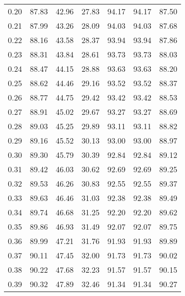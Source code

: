 \begin{tabular}{|c|c|c|c|c|c|c|}
      0.20 &     87.83 &     42.96 &      27.83 &   94.17 &      94.17 &         87.50 \\
      0.21 &     87.99 &     43.26 &      28.09 &   94.03 &      94.03 &         87.68 \\
      0.22 &     88.16 &     43.58 &      28.37 &   93.94 &      93.94 &         87.86 \\
      0.23 &     88.31 &     43.84 &      28.61 &   93.73 &      93.73 &         88.03 \\
      0.24 &     88.47 &     44.15 &      28.88 &   93.63 &      93.63 &         88.20 \\
      0.25 &     88.62 &     44.46 &      29.16 &   93.52 &      93.52 &         88.37 \\
      0.26 &     88.77 &     44.75 &      29.42 &   93.42 &      93.42 &         88.53 \\
      0.27 &     88.91 &     45.02 &      29.67 &   93.27 &      93.27 &         88.69 \\
      0.28 &     89.03 &     45.25 &      29.89 &   93.11 &      93.11 &         88.82 \\
      0.29 &     89.16 &     45.52 &      30.13 &   93.00 &      93.00 &         88.97 \\
      0.30 &     89.30 &     45.79 &      30.39 &   92.84 &      92.84 &         89.12 \\
      0.31 &     89.42 &     46.03 &      30.62 &   92.69 &      92.69 &         89.25 \\
      0.32 &     89.53 &     46.26 &      30.83 &   92.55 &      92.55 &         89.37 \\
      0.33 &     89.63 &     46.46 &      31.03 &   92.38 &      92.38 &         89.49 \\
      0.34 &     89.74 &     46.68 &      31.25 &   92.20 &      92.20 &         89.62 \\
      0.35 &     89.86 &     46.93 &      31.49 &   92.07 &      92.07 &         89.75 \\
      0.36 &     89.99 &     47.21 &      31.76 &   91.93 &      91.93 &         89.89 \\
      0.37 &     90.11 &     47.45 &      32.00 &   91.73 &      91.73 &         90.02 \\
      0.38 &     90.22 &     47.68 &      32.23 &   91.57 &      91.57 &         90.15 \\
      0.39 &     90.32 &     47.89 &      32.46 &   91.34 &      91.34 &         90.27 \\

\end{tabular}
